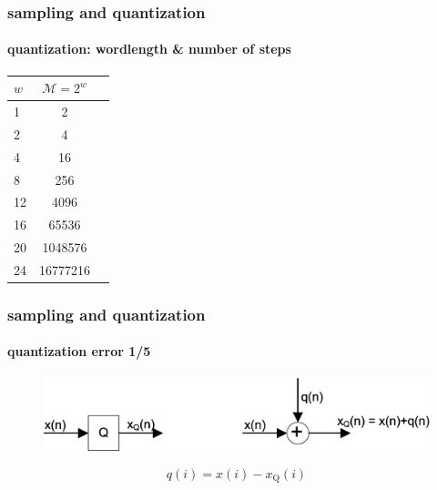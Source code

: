	\begin{frame}\frametitle{sampling and quantization}\framesubtitle{quantization: wordlength \& number of steps}
		\begin{table}
			\centering
			\begin{tabular}{lcr}
			\hline
				$w$ & $\mathcal{M} = 2^w$ \\
			\hline
				1	&	2\\
				2	&	4\\
				4	&	16\\
				8	&	256\\
				12	&	4096\\
				16	&	65536\\
				20	&	1048576\\
				24	&	16777216\\
			\end{tabular}  
		\end{table}
	\end{frame}
	\begin{frame}\frametitle{sampling and quantization}\framesubtitle{quantization error 1/5}
		\begin{figure}
			\centering
			 \includegraphics[scale=0.13]{Graph/Flowchart_Quantization}
		\end{figure}
		\begin{equation}
			q(i) = x(i) - x_{\mathrm{Q}}(i)
		\end{equation}
	\end{frame}		
